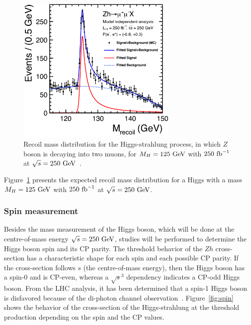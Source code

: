     \begin{figure}[!tbh]
      \centering
      \includegraphics[width = 0.7\textwidth]{Pictures/Higgs/Figures_SP_RECOIL_mmX_newstat.png}
      \caption{Recoil mass distribution for the Higgs-strahlung process, in which $Z$ boson is decaying into two muons, for $M_H = 125~\rm{GeV}$ with $250~\rm{fb}^{-1}$ at $\sqrt{s} = 250~\rm{GeV}$~\cite{Li:2012taa}.}
      \label{fig:recoilMass}
    \end{figure}

    Figure~\ref{fig:recoilMass} presents the expected recoil mass distribution for a Higgs with a mass $M_H = 125~\rm{GeV}$ with $250~\rm{fb}^{-1}$ at $\sqrt{s} = 250~\rm{GeV}$. 

    \subsubsection{Spin measurement}

    Besides the mass measurement of the Higgs boson, which will be done at the centre-of-mass energy $\sqrt{s} = 250~\rm{GeV}$, studies will be performed to determine the Higgs boson spin and its CP parity.
    The threshold behavior of the $Zh$ cross-section has a characteristic shape for each spin and each possible CP parity.
    If the cross-section follows $s$ (the centre-of-mass energy), then the Higgs boson has a spin-0 and is CP-even, whereas a $\sqrt{s}^3$ dependency indicates a CP-odd Higgs boson.
    From the \gls{LHC} analysis, it has been determined that a spin-1 Higgs boson is disfavored because of the di-photon channel observation~\cite{TheATLASCollaboration2013}.
    Figure~\ref{fig:spin}~\cite{Dova2003} shows the behavior of the cross-section of the Higgs-strahlung at the threshold production depending on the spin and the CP values.
    
